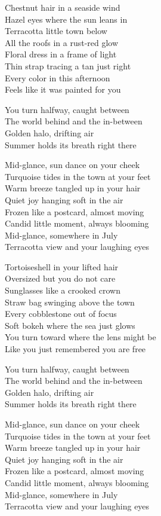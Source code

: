 \begin{lyrics}
Chestnut hair in a seaside wind\\
Hazel eyes where the sun leans in\\
Terracotta little town below\\
All the roofs in a rust-red glow\\
Floral dress in a frame of light\\
Thin strap tracing a tan just right\\
Every color in this afternoon\\
Feels like it was painted for you

You turn halfway, caught between\\
The world behind and the in-between\\
Golden halo, drifting air\\
Summer holds its breath right there

Mid-glance, sun dance on your cheek\\
Turquoise tides in the town at your feet\\
Warm breeze tangled up in your hair\\
Quiet joy hanging soft in the air\\
Frozen like a postcard, almost moving\\
Candid little moment, always blooming\\
Mid-glance, somewhere in July\\
Terracotta view and your laughing eyes

Tortoiseshell in your lifted hair\\
Oversized but you do not care\\
Sunglasses like a crooked crown\\
Straw bag swinging above the town\\
Every cobblestone out of focus\\
Soft bokeh where the sea just glows\\
You turn toward where the lens might be\\
Like you just remembered you are free

You turn halfway, caught between\\
The world behind and the in-between\\
Golden halo, drifting air\\
Summer holds its breath right there

Mid-glance, sun dance on your cheek\\
Turquoise tides in the town at your feet\\
Warm breeze tangled up in your hair\\
Quiet joy hanging soft in the air\\
Frozen like a postcard, almost moving\\
Candid little moment, always blooming\\
Mid-glance, somewhere in July\\
Terracotta view and your laughing eyes


\end{lyrics}
